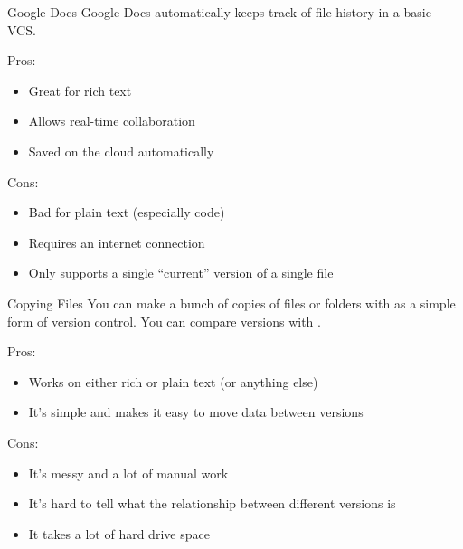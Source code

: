 \begin{frame}{Google Docs}
  Google Docs automatically keeps track of file history in a basic VCS.

  Pros:
  \begin{itemize}
    \item Great for rich text
    \item Allows real-time collaboration
    \item Saved on the cloud automatically
  \end{itemize}

  Cons:
  \begin{itemize}
    \item Bad for plain text (especially code)
    \item Requires an internet connection
    \item Only supports a single \enquote{current} version of a single file
  \end{itemize}

\end{frame}

\begin{frame}{Copying Files}
  You can make a bunch of copies of files or folders with  as a simple
  form of version control.  You can compare versions with .

  Pros:
  \begin{itemize}
    \item Works on either rich or plain text (or anything else)
    \item It's simple and makes it easy to move data between versions
  \end{itemize}

  Cons:
  \begin{itemize}
    \item It's messy and a lot of manual work
    \item It's hard to tell what the relationship between different versions
      is
    \item It takes a lot of hard drive space
  \end{itemize}
\end{frame}


